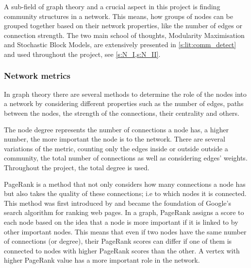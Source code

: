 A sub-field of graph theory and a crucial aspect in this project is finding community structures in a network. This means, how groups of nodes can be grouped together based on their network properties, like the number of edges or connection strength. The two main school of thoughts, Modularity Maximisation and Stochastic Block Models, are extensively presented in \cref{s:lit:comm_detect} and used throughout the project, see \cref{s:N_I,s:N_II}.




\subsubsection{Network metrics} \label{s:lit:net_metrics}

In graph theory there are several methods to determine the role of the nodes into a network by considering different properties such as the number of edges, paths between the nodes, the strength of the connections, their centrality and others.

The node degree represents the number of connections a node has, a higher number, the more important the node is to the network. There are several variations of the metric, counting only the edges inside or outside outside a community, the total number of connections as well as considering edges' weights. Throughout the project, the total degree is used.

PageRank is a method that not only considers how many connections a node has but also takes the quality of these connections; i.e to which nodes it is connected. This method was first introduced by \citet{Brin1998-mc} and became the foundation of Google's search algorithm for ranking web pages. In a graph, PageRank assigns a score to each node based on the idea that a node is more important if it is linked to by other important nodes. This means that even if two nodes have the same number of connections (or degree), their PageRank scores can differ if one of them is connected to nodes with higher PageRank scores than the other. A vertex with higher PageRank value has a more important role in the network.

